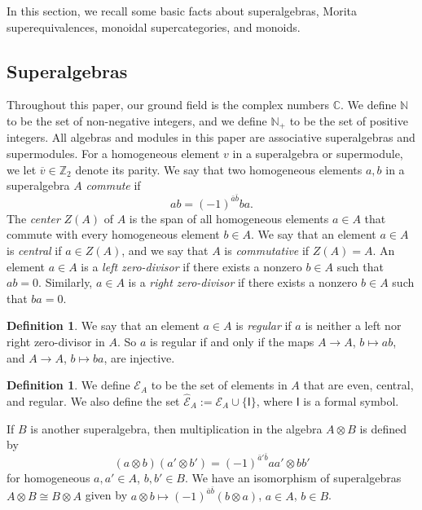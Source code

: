 \documentclass[11pt]{amsart}
\newcommand\go{\mathsf{I}}              %
\theoremstyle{definition}
\newtheorem{defn}[theo]{Definition}
\numberwithin{equation}{section}
\begin{document}
In this section, we recall some basic facts about superalgebras, Morita superequivalences, monoidal supercategories, and monoids. 

\subsection{Superalgebras}

Throughout this paper, our ground field is the complex numbers $ \mathbb{C} $. We define $ \mathbb{N} $ to be the set of non-negative integers, and we define $ \mathbb{N}_{+} $ to be the set of positive integers. All algebras and modules in this paper are associative superalgebras and supermodules. For a homogeneous element $ v $ in a superalgebra or supermodule, we let $\overline{v} \in \mathbb{Z}_{2} $ denote its parity. We say that two homogeneous elements $ a,b $ in a superalgebra $ A $ \emph{commute} if 
\begin{equation*}
ab = (-1)^{\bar{a}\bar{b}}ba.
\end{equation*} 
The \emph{center} $ Z(A) $ of \(A\) is the span of all homogeneous elements $ a \in A $ that commute with every homogeneous element $ b \in A $. We say that an element $ a \in A $ is \emph{central} if $ a \in Z(A) $, and we say that \(A\) is \emph{commutative} if $ Z(A) = A $. An element $ a \in A $ is a \emph{left zero-divisor} if there exists a nonzero $ b \in A $ such that $ ab = 0 $. Similarly, $ a \in A $ is a \emph{right zero-divisor} if there exists a nonzero $ b \in A $ such that $ ba = 0 $.

\begin{defn} \label{uncharted_general}
We say that an element $ a \in A $ is \emph{regular} if \(a\) is neither a left nor right zero-divisor in \(A\). So \(a\) is regular if and only if the maps $ A \rightarrow A $, $ b \mapsto ab $, and $ A \rightarrow A $, $ b \mapsto ba $, are injective.
\end{defn}

\begin{defn} \label{opportunity}
We define $ \mathcal{E}_{A} $ to be the set of elements in $ A $ that are even, central, and regular. We also define the set $ \widehat{\mathcal{E}}_{A} := \mathcal{E}_{A} \cup \{\go\} $, where $ \go $ is a formal symbol.
\end{defn}


If $ B $ is another superalgebra, then multiplication in the algebra $ A \otimes B $ is defined by
\begin{equation*}
    (a \otimes b) (a' \otimes b') = (-1)^{\bar a' \bar b} aa' \otimes bb'
\end{equation*}
for homogeneous $ a,a' \in A $, $ b,b' \in B $. We have an isomorphism of superalgebras $ A \otimes B \cong B \otimes A $ given by $ a \otimes b \mapsto (-1)^{\bar{a}\bar{b}} (b \otimes a) $, $ a \in A $, $ b \in B $.
\end{document}
